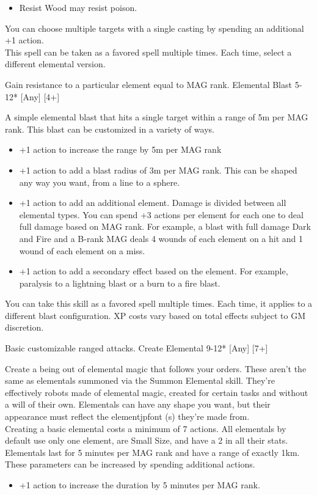 \begin{pathele}
{\begin{itemize}
\item Resist Wood may resist poison.
\end{itemize}
You can choose multiple targets with a single casting by spending an additional +1 action.\\This spell can be taken as a favored spell multiple times. Each time, select a different elemental version.}
{Gain resistance to a particular element equal to MAG rank.}
\spelldescription
{Elemental Blast}
{5-12*}
[Any]
[4+]
{A simple elemental blast that hits a single target within a range of 5m per MAG rank. This blast can be customized in a variety of ways.
\begin{itemize}
\item +1 action to increase the range by 5m per MAG rank
\item +1 action to add a blast radius of 3m per MAG rank. This can be shaped any way you want, from a line to a sphere.
\item +1 action to add an additional element. Damage is divided between all elemental types. You can spend +3 actions per element for each one to deal full damage based on MAG rank. For example, a blast with full damage Dark and Fire and a B-rank MAG deals 4 wounds of each element on a hit and 1 wound of each element on a miss.
\item +1 action to add a secondary effect based on the element. For example, paralysis to a lightning blast or a burn to a fire blast.
\end{itemize}
You can take this skill as a favored spell multiple times. Each time, it applies to a different blast configuration. XP costs vary based on total effects subject to GM discretion.}
{Basic customizable ranged attacks.}
\spelldescription
{Create Elemental}
{9-12*}
[Any]
[7+]
{Create a being out of elemental magic that follows your orders. These aren't the same as elementals summoned via the Summon Elemental skill. They're effectively robots made of elemental magic, created for certain tasks and without a will of their own. Elementals can have any shape you want, but their appearance must reflect the element{jpfont (s)} they're made from.\\
Creating a basic elemental costs a minimum of 7 actions. All elementals by default use only one element, are Small Size, and have a 2 in all their stats. Elementals last for 5 minutes per MAG rank and have a range of exactly 1km. These parameters can be increased by spending additional actions.
\begin{itemize}
\item +1 action to increase the duration by 5 minutes per MAG rank.

\end{itemize}}
\end{pathele}
